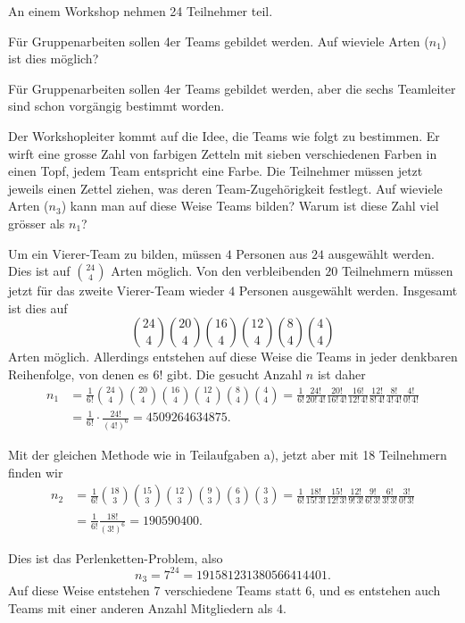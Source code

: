 An einem Workshop nehmen 24 Teilnehmer teil.
\begin{teilaufgaben}
\item
Für Gruppenarbeiten sollen 4er Teams gebildet werden.
Auf wieviele Arten ($n_1$) ist dies möglich?
\item
Für Gruppenarbeiten sollen 4er Teams gebildet werden, aber die
sechs Teamleiter sind schon vorgängig bestimmt worden.
\item
Der Workshopleiter kommt auf die Idee, die Teams wie folgt zu
bestimmen.
Er wirft eine grosse Zahl von farbigen Zetteln mit sieben verschiedenen
Farben in einen Topf, jedem Team entspricht eine Farbe.
Die Teilnehmer müssen jetzt jeweils einen Zettel ziehen, was deren
Team-Zugehörigkeit festlegt.
Auf wieviele Arten ($n_3$) kann man auf diese Weise Teams bilden?
Warum ist diese Zahl viel grösser als $n_1$?
\end{teilaufgaben}


\begin{loesung}
\begin{teilaufgaben}
\item 
Um ein Vierer-Team zu bilden, müssen $4$ Personen aus $24$ ausgewählt werden.
Dies ist auf $\binom{24}{4}$ Arten möglich.
Von den verbleibenden $20$ Teilnehmern müssen jetzt für das zweite Vierer-Team
wieder $4$ Personen ausgewählt werden.
Insgesamt ist dies auf 
\[
\binom{24}{4}
\binom{20}{4}
\binom{16}{4}
\binom{12}{4}
\binom{8}{4}
\binom{4}{4}
\]
Arten möglich.
Allerdings entstehen auf diese Weise die Teams in jeder denkbaren
Reihenfolge, von denen es $6!$ gibt.
Die gesucht Anzahl $n$ ist daher
\begin{align*}
n_1
&=
\frac{1}{6!}
\binom{24}{4}
\binom{20}{4}
\binom{16}{4}
\binom{12}{4}
\binom{8}{4}
\binom{4}{4}
=
\frac{1}{6!}
\frac{24!}{20!\,4!}
\frac{20!}{16!\,4!}
\frac{16!}{12!\,4!}
\frac{12!}{8!\,4!}
\frac{8!}{4!\,4!}
\frac{4!}{0!\,4!}
\\
&=
\frac1{6!}\cdot \frac{24!}{(4!)^6}
=
4509264634875
.
\end{align*}
\item 
Mit der gleichen Methode wie in Teilaufgaben a), jetzt aber mit 18 Teilnehmern
finden wir
\begin{align*}
n_2
&=
\frac1{6!}
\binom{18}{3}
\binom{15}{3}
\binom{12}{3}
\binom{9}{3}
\binom{6}{3}
\binom{3}{3}
=
\frac{1}{6!}
\frac{18!}{15!\,3!}
\frac{15!}{12!\,3!}
\frac{12!}{9!\,3!}
\frac{9!}{6!\,3!}
\frac{6!}{3!\,3!}
\frac{3!}{0!\,3!}
\\
&=
\frac{1}{6!}
\frac{18!}{(3!)^6}
=
190590400
.
\end{align*}
\item
Dies ist das Perlenketten-Problem, 
also
\[
n_3
=
7^{24}
=
191581231380566414401.
\]
Auf diese Weise entstehen 7 verschiedene Teams statt 6, und es entstehen
auch Teams mit einer anderen Anzahl
Mitgliedern als $4$.
\qedhere
\end{teilaufgaben}
\end{loesung}

